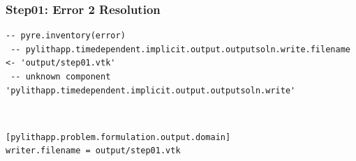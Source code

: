 \documentclass{beamer}
\begin{document}
\begin{frame}[fragile]
  \frametitle{Step01: Error 2 Resolution}

\begin{lstlisting}
-- pyre.inventory(error)
 -- pylithapp.timedependent.implicit.output.outputsoln.write.filename <- 'output/step01.vtk'
 -- unknown component
'pylithapp.timedependent.implicit.output.outputsoln.write'
\end{lstlisting}\pause
{} \pause\\
\begin{lstlisting}
[pylithapp.problem.formulation.output.domain]
writer.filename = output/step01.vtk
\end{lstlisting}
  
\end{frame}
\end{document}
